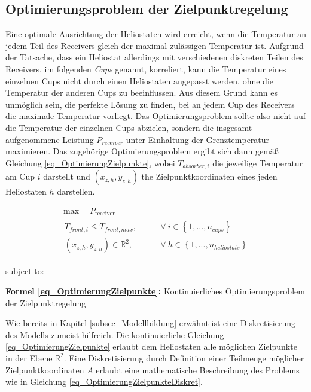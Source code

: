 \subsection{Optimierungsproblem der Zielpunktregelung} \label{subsec_OptimierungZielpunkte}
Eine optimale Ausrichtung der Heliostaten wird erreicht, wenn die Temperatur an jedem Teil des Receivers gleich der maximal zulässigen Temperatur ist.
Aufgrund der Tatsache, dass ein Heliostat allerdings mit verschiedenen diskreten Teilen des Receivers, im folgenden \textit{Cups} genannt, korreliert, kann die Temperatur eines einzelnen Cups nicht durch einen Heliostaten angepasst werden, ohne die Temperatur der anderen Cups zu beeinflussen.
Aus diesem Grund kann es unmöglich sein, die perfekte Lösung zu finden, bei an jedem Cup des Receivers die maximale Temperatur vorliegt.
Das Optimierungsproblem sollte also nicht auf die Temperatur der einzelnen Cups abzielen, sondern die insgesamt aufgenommene Leistung $P_{receiver}$ unter Einhaltung der Grenztemperatur maximieren.
Das zugehörige Optimierungsproblem ergibt sich dann gemäß Gleichung \ref{eq_OptimierungZielpunkte}, wobei $T_{absorber,i}$ die jeweilige Temperatur am Cup $i$ darstellt und $(x_{z,h}, y_{z,h})$ the Zielpunktkoordinaten eines jeden Heliostaten $h$ darstellen. \cite[S. 15]{DissZanger}

\begin{equation} \label{eq_OptimierungZielpunkte}
\begin{gathered}
    \max \quad P_{\text {receiver }}  \qquad \\
    \begin{aligned}
        T_{front,i} \leq T_{front,max}, \qquad                 & \forall~i \in \left\{1, ..., n_{cups} \right\}       \\
        \left(x_{z,h}, y_{z,h}\right) \in \mathbb{R}^2, \qquad & \forall~h \in \left\{1, ..., n_{heliostats} \right\}
    \end{aligned}
\end{gathered}
\end{equation}

\vspace*{-2.95\baselineskip}
\qquad subject to:
\vspace*{1.95\baselineskip}
\centerline{\small{\textsf{\textbf{Formel \ref{eq_OptimierungZielpunkte}:}} Kontinuierliches Optimierungsproblem der Zielpunktregelung}}

Wie bereits in Kapitel \ref{subsec_Modellbildung} erwähnt ist eine Diskretisierung des Modells zumeist hilfreich.
Die kontinuierliche Gleichung \ref{eq_OptimierungZielpunkte} erlaubt dem Heliostaten alle möglichen Zielpunkte in der Ebene $\mathbb{R}^2$.
Eine Diskretisierung durch Definition einer Teilmenge möglicher Zielpunktkoordinaten $A$ erlaubt eine mathematische Beschreibung des Problems wie in Gleichung \ref{eq_OptimierungZielpunkteDiskret}.

